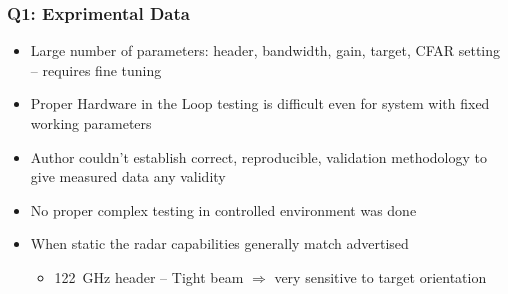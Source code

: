 \documentclass[aspectratio=43]{beamer}
\begin{document}
\begin{frame}[fragile]
  \frametitle{Q1: Exprimental Data}

  \begin{itemize}
    \item Large number of parameters: header, bandwidth, gain, target, CFAR setting -- requires fine tuning
		\item Proper Hardware in the Loop testing is difficult even for system with fixed working parameters
		\item Author couldn't establish correct, reproducible, validation methodology to give measured data any validity
		\item No proper complex testing in controlled environment was done
    \item When static the radar capabilities generally match advertised
			\begin{itemize}
    \item 122~GHz header -- Tight beam $\Rightarrow$ very sensitive to target orientation
			\end{itemize}
  \end{itemize}
\end{frame}
\end{document}
